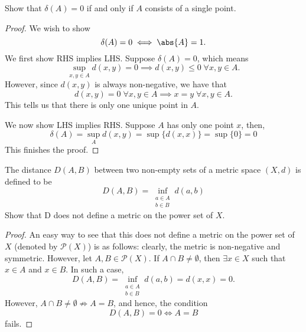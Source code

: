  \begin{question}
    Show that $\delta(A) = 0$ if and only if $A$ consists of a single point.
    \label{section1.2-7}
\end{question}
\begin{proof}
    We wish to show
    \[\delta(A) = 0 \iff \abs{A} = 1.\]
    We first show RHS implies LHS. Suppose $\delta(A) = 0$, which means
    \[\sup_{x,y \in A} d(x,y) = 0 \implies d(x,y) \leq 0 \; \forall x,y \in A.\]
    However, since $d(x,y)$ is always non-negative, we have that 
    \[d(x,y) = 0 \; \forall x,y \in A \implies x = y \; \forall x,y \in A.\]
    This tells us that there is only one unique point in $A$.

    We now show LHS implies RHS. Suppose $A$ has only one point $x$, then, 
    \[\delta(A) =\sup_{A} d(x,y) = \sup \{d(x,x)\} = \sup \{0\} = 0\]
    This finishes the proof.
\end{proof}

\begin{question}
    The distance $D(A,B)$ between two non-empty sets of a metric space $(X,d)$ is defined to be 
    \[D(A,B) = \inf_{\substack{a \in A \\ b \in B}} d(a,b)\]
    Show that D does not define a metric on the power set of $X$.
    \label{section1.2-8}
\end{question}
\begin{proof}
    An easy way to see that this does not define a metric on the power set of $X$ (denoted by $\mathcal{P}(X)$) is as follows: clearly, the metric is non-negative and symmetric. However, let $A , B \in \mathcal{P}(X)$. If $A \cap B \neq \emptyset$, then $\exists x \in X$ such that $x \in A$ and $x \in B$. In such a case,
    \[D(A,B) = \inf_{\substack{a \in A \\ b \in B}} d(a,b) = d(x,x) = 0.\]
    However, $A \cap B \neq \emptyset \nRightarrow A = B$, and hence, the condition
    \[D(A,B) = 0 \iff A = B\]
    fails.
\end{proof}

